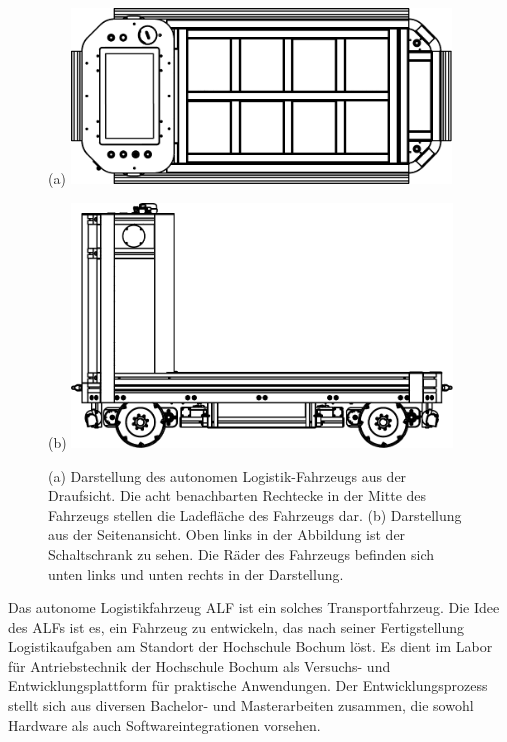 		\begin{figure}[H]
			\begin{minipage}[b]{0.49\textwidth}
				(a)
				\includegraphics[width=0.9\textwidth]{Bilder/oben.pdf}
			\end{minipage}
			\begin{minipage}[b]{0.49\textwidth}
				(b)
				\includegraphics[width=0.9\textwidth]{Bilder/seite.pdf}
			\end{minipage}
			\centering
			\caption{(a) Darstellung des autonomen Logistik-Fahrzeugs aus der Draufsicht. Die acht benachbarten Rechtecke in der Mitte des Fahrzeugs stellen die Ladefläche des Fahrzeugs dar. (b) Darstellung aus der Seitenansicht. Oben links in der Abbildung ist der Schaltschrank zu sehen. Die Räder des Fahrzeugs befinden sich unten links und unten rechts in der Darstellung.}
			\label{fig: Darstellung des ALFs}
		\end{figure}
		
		Das autonome Logistikfahrzeug ALF ist ein solches Transportfahrzeug. Die Idee des ALFs ist es, ein Fahrzeug zu entwickeln, das nach seiner Fertigstellung Logistikaufgaben am Standort der Hochschule Bochum löst. Es dient im Labor für Antriebstechnik der Hochschule Bochum als Versuchs- und Entwicklungsplattform für praktische Anwendungen. Der Entwicklungsprozess stellt sich aus diversen Bachelor- und Masterarbeiten zusammen, die sowohl Hardware als auch Softwareintegrationen vorsehen.\\
		
